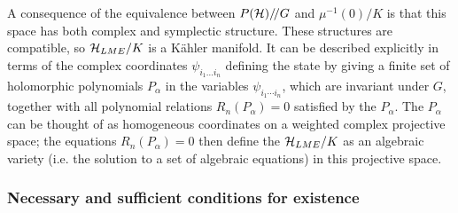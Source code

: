 \documentclass[12pt]{article}
\theoremstyle{definition}
\newcommand{\GITquot}{/\!/}
\begin{document}
A consequence of the equivalence between $P({\cal H})\GITquot G$ and
$\mu^{-1}(0)/K$ is that this space has both complex and symplectic
structure. These structures are compatible, so ${\cal H}_{LME}/K$ is a
K\"ahler manifold. It can be described explicitly in terms of the
complex coordinates $\psi_{i_1 \dots i_n}$ defining the state by
giving a finite set of holomorphic polynomials $P_{\alpha }$ in the
variables $\psi_{i_{1}\dotsb i_{n}}$, which are invariant under $G$,
together with all polynomial relations $R_n(P_\alpha ) = 0$ satisfied
by the $P_{\alpha }$. The $P_\alpha $ can be thought of as homogeneous
coordinates on a weighted complex projective space; the equations
$R_n(P_\alpha ) = 0$ then define the ${\cal H}_{LME}/K$ as an
algebraic variety (i.e. the solution to a set of algebraic equations)
in this projective space.

\subsubsection*{Necessary and sufficient conditions for existence}
\end{document}
